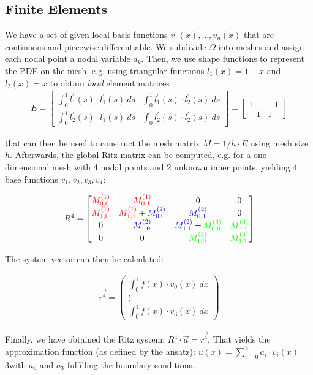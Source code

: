 \subsection{Finite Elements}

We have a set of given local basis functions $v_1(x), \ldots, v_n(x)$ that are continuous and piecewise differentiable.
We subdivide $\Omega$ into meshes and assign each nodal point a nodal variable $a_k$.
Then, we use shape functions to represent the PDE on the mesh,
e.g. using triangular functions $l_1(x)=1-x$ and $l_2(x) = x$ to obtain \emph{local} element matrices
\begin{align*}
	E = 
	\begin{bmatrix}
		\int_0^1 l_1^\prime(s)\cdot l_1^\prime(s)\ ds & \int_0^1 l_1^\prime(s)\cdot l_2^\prime(s)\ ds \\
		\int_0^1 l_2^\prime(s)\cdot l_1^\prime(s)\ ds & \int_0^1 l_2^\prime(s)\cdot l_2^\prime(s)\ ds
	\end{bmatrix}
	=
	\begin{bmatrix}
		1 & -1 \\
		-1 & 1
	\end{bmatrix}
\end{align*}

that can then be used to construct the mesh matrix $M=1/h\cdot E$ using mesh size $h$.
Afterwards, the global Ritz matrix can be computed, e.g. for a one-dimensional mesh with 4 nodal points and 2 unknown inner points,
yielding 4 base functions $v_1,v_2,v_3,v_4$:

\begin{align*}
	R^4 = \begin{bmatrix}
		{\color{red} M^{(1)}_{0,0}} & \color{red}{M^{(1)}_{0,1}} & 0 & 0 \\
		{\color{red} M^{(1)}_{1,0}} & {\color{red} M^{(1)}_{1,1}} + {\color{blue} M^{(2)}_{0,0}} & {\color{blue} M^{(2)}_{0,1}} & 0 \\
		0 & {\color{blue} M^{(2)}_{1,0}} & {\color{blue} M^{(2)}_{1,1}} + {\color{green} M^{(3)}_{0,0}} & {\color{green} M^{(3)}_{0,1}} \\
		0 & 0 & {\color{green} M^{(3)}_{1,0}} & {\color{green} M^{(3)}_{1,1}}
	\end{bmatrix}
\end{align*}

The system vector can then be calculated:

\begin{align*}
	\vec{r^4} = \begin{pmatrix}
		\int_0^1 f(x)\cdot v_0(x)\ dx \\
		\vdots \\
		\int_0^1 f(x)\cdot v_3(x)\ dx
	\end{pmatrix}
\end{align*}

Finally, we have obtained the Ritz system: $R^4\cdot\vec{a}=\vec{r^4}$.
That yields the approximation function (as defined by the ansatz): $\tilde{u}(x)=\sum_{i=0}^3 a_i\cdot v_i(x)$
3with $a_0$ and $a_3$ fulfilling the boundary conditions.